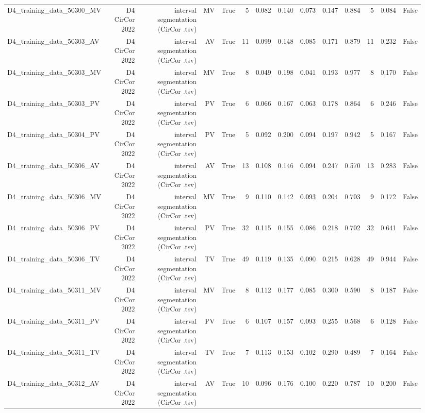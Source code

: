 \begin{table}[htbp]
\begin{tabular}{lrrrrrrrrrrrrr}
    D4\_training\_data\_50300\_MV & D4 CirCor 2022 & interval segmentation (CirCor .tsv) & MV & True & 5 & 0.082 & 0.140 & 0.073 & 0.147 & 0.884 & 5 & 0.084 & False \\
    D4\_training\_data\_50303\_AV & D4 CirCor 2022 & interval segmentation (CirCor .tsv) & AV & True & 11 & 0.099 & 0.148 & 0.085 & 0.171 & 0.879 & 11 & 0.232 & False \\
    D4\_training\_data\_50303\_MV & D4 CirCor 2022 & interval segmentation (CirCor .tsv) & MV & True & 8 & 0.049 & 0.198 & 0.041 & 0.193 & 0.977 & 8 & 0.170 & False \\
    D4\_training\_data\_50303\_PV & D4 CirCor 2022 & interval segmentation (CirCor .tsv) & PV & True & 6 & 0.066 & 0.167 & 0.063 & 0.178 & 0.864 & 6 & 0.246 & False \\
    D4\_training\_data\_50304\_PV & D4 CirCor 2022 & interval segmentation (CirCor .tsv) & PV & True & 5 & 0.092 & 0.200 & 0.094 & 0.197 & 0.942 & 5 & 0.167 & False \\
    D4\_training\_data\_50306\_AV & D4 CirCor 2022 & interval segmentation (CirCor .tsv) & AV & True & 13 & 0.108 & 0.146 & 0.094 & 0.247 & 0.570 & 13 & 0.283 & False \\
    D4\_training\_data\_50306\_MV & D4 CirCor 2022 & interval segmentation (CirCor .tsv) & MV & True & 9 & 0.110 & 0.142 & 0.093 & 0.204 & 0.703 & 9 & 0.172 & False \\
    D4\_training\_data\_50306\_PV & D4 CirCor 2022 & interval segmentation (CirCor .tsv) & PV & True & 32 & 0.115 & 0.155 & 0.086 & 0.218 & 0.702 & 32 & 0.641 & False \\
    D4\_training\_data\_50306\_TV & D4 CirCor 2022 & interval segmentation (CirCor .tsv) & TV & True & 49 & 0.119 & 0.135 & 0.090 & 0.215 & 0.628 & 49 & 0.944 & False \\
    D4\_training\_data\_50311\_MV & D4 CirCor 2022 & interval segmentation (CirCor .tsv) & MV & True & 8 & 0.112 & 0.177 & 0.085 & 0.300 & 0.590 & 8 & 0.187 & False \\
    D4\_training\_data\_50311\_PV & D4 CirCor 2022 & interval segmentation (CirCor .tsv) & PV & True & 6 & 0.107 & 0.157 & 0.093 & 0.255 & 0.568 & 6 & 0.128 & False \\
    D4\_training\_data\_50311\_TV & D4 CirCor 2022 & interval segmentation (CirCor .tsv) & TV & True & 7 & 0.113 & 0.153 & 0.102 & 0.290 & 0.489 & 7 & 0.164 & False \\
    D4\_training\_data\_50312\_AV & D4 CirCor 2022 & interval segmentation (CirCor .tsv) & AV & True & 10 & 0.096 & 0.176 & 0.100 & 0.220 & 0.787 & 10 & 0.200 & False \\

\end{tabular}
\end{table}
